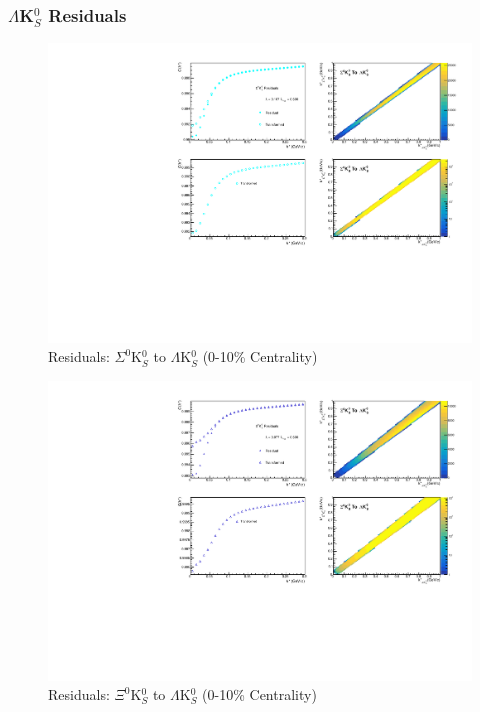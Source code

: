 \documentclass[../AnalysisNoteJBuxton.tex]{subfiles}
\begin{document}
\subsubsection{\texorpdfstring{$\Lambda$K$^{0}_{S}$}{TEXT} Residuals}
\label{Residuals_LamK0}

\begin{figure}[h]
  \centering
  \includegraphics[width=\textwidth]{9_AdditionalFigures/Figures/Residuals/LamK0/Residuals_LamK0_0010_Sig0K0_MomResCrctn_NonFlatBgdCrctn_SingleLamParam_10Res_PrimMaxDecay4fm_UsingXiDataAndCoulombOnly.pdf}
  \caption[Residuals: $\Sigma^{0}$K$^{0}_{S}$ to $\Lambda$K$^{0}_{S}$ (0-10\% Centrality)]{Residuals: $\Sigma^{0}$K$^{0}_{S}$ to $\Lambda$K$^{0}_{S}$ (0-10\% Centrality)}
  \label{fig:Res_LamK0_0010_Sig0K0}
\end{figure}


\begin{figure}[h]
  \centering
  \includegraphics[width=\textwidth]{9_AdditionalFigures/Figures/Residuals/LamK0/Residuals_LamK0_0010_Xi0K0_MomResCrctn_NonFlatBgdCrctn_SingleLamParam_10Res_PrimMaxDecay4fm_UsingXiDataAndCoulombOnly.pdf}
  \caption[Residuals: $\Xi^{0}$K$^{0}_{S}$ to $\Lambda$K$^{0}_{S}$ (0-10\% Centrality)]{Residuals: $\Xi^{0}$K$^{0}_{S}$ to $\Lambda$K$^{0}_{S}$ (0-10\% Centrality)}
  \label{fig:Res_LamK0_0010_Xi0K0}
\end{figure}
\end{document}
